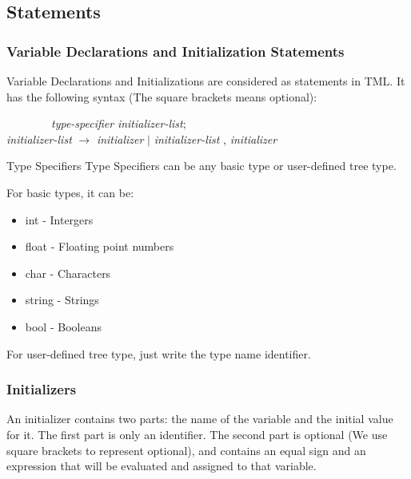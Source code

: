 \documentclass[12pt,psfig,a4]{article}
\begin{document}


\subsection{Statements}

\subsubsection{Variable Declarations and Initialization Statements}
Variable Declarations and Initializations are considered as statements in TML. It has the following syntax (The square brackets means optional):

\begin{code}
\begin{tabbing}
~~~~~~~~\= \textsl{type-specifier} \textsl{initializer-list}; \\
\> \textsl{initializer-list}  $\rightarrow$ \textsl{initializer} $\mid$ \textsl{initializer-list} , \textsl{initializer}
\end{tabbing}
\end{code}


\begin{description}
\item{Type Specifiers}
\label{typeSpec}
\label{ts}
Type Specifiers can be any basic type or user-defined tree type.
\end{description}

For basic types, it can be:
\begin{itemize}
\setlength{\itemsep}{0pt}
\setlength{\parskip}{0pt}
\item int - Intergers
\item float - Floating point numbers
\item char - Characters
\item string - Strings
\item bool - Booleans
\end{itemize}

For user-defined tree type, just write the type name identifier.

\subsubsection{Initializers}
An initializer contains two parts: the name of the variable and the initial value for it. The first part is only an identifier. The second part is optional (We use square brackets to represent optional), and contains an equal sign and an expression that will be evaluated and assigned to that variable.
\end{document}
